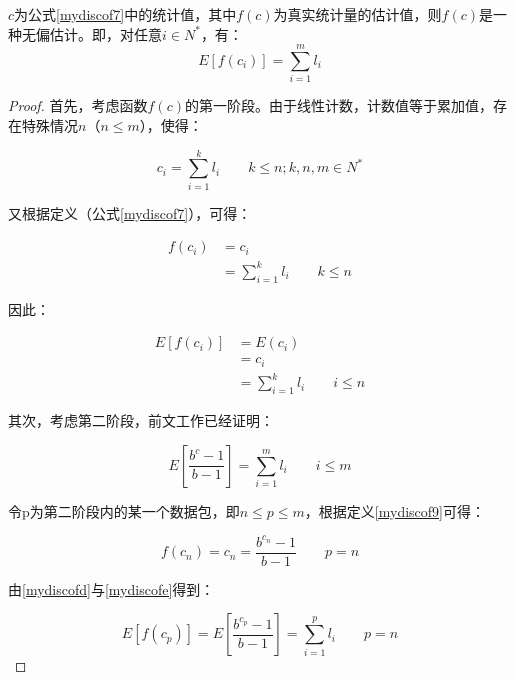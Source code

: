 \begin{theorem}%
	$ c $为公式\ref{mydiscof7}中的统计值，其中$ f(c) $为真实统计量的估计值，则$ f(c) $是一种无偏估计。即，对任意$ i\in N^{\ast} $，有：
\begin{equation} \label{mydiscof8}
E[f(c_i)]=\sum ^{m}_{i=1}l_{i}
\end{equation}	
\end{theorem}

\begin{proof}
	首先，考虑函数$ f(c) $的第一阶段。由于线性计数，计数值等于累加值，存在特殊情况$n$（$ n\leq m $），使得：

	\begin{equation} \label{mydiscofa}
	c_i=\sum ^{k}_{i=1}l_{i} \quad\quad k \leq n; k,n,m \in N^{\ast}
	\end{equation}
	
	又根据定义（公式\ref{mydiscof7}），可得：
	
	\begin{align}\label{mydiscofb}
	f(c_i) &= c_i \nonumber \\
	&=\sum ^{k}_{i=1}l_{i} \quad\quad k \leq n
	\end{align}
	
	因此：
	
	\begin{align}\label{mydiscofc}
	E[f(c_i)] &= E(c_i) \nonumber \\
	&=c_i \nonumber  \\
	&=\sum ^{k}_{i=1}l_{i} \quad\quad i \leq n
	\end{align}
	
	其次，考虑第二阶段，前文工作已经证明：
	
	\begin{equation} \label{mydiscofd}
	E[\dfrac{b^c-1}{b-1}]=\sum_{i=1}^{m}l_i \quad\quad i \leq m
	\end{equation}
	
	令p为第二阶段内的某一个数据包，即$ n \leq p \leq m $，根据定义\ref{mydiscof9}可得：
	
	\begin{equation} \label{mydiscofe}
		f(c_n) = c_n = \dfrac{b^{c_n}-1}{b-1}\quad\quad p=n
	\end{equation}
	
	由\ref{mydiscofd}与\ref{mydiscofe}得到：
	
	\begin{equation} \label{mydiscoff}
	E[f(c_p)]=E[\dfrac{b^{c_p}-1}{b-1}]=\sum_{i=1}^{p}l_i\quad\quad p=n
	\end{equation}
	

\end{proof}
